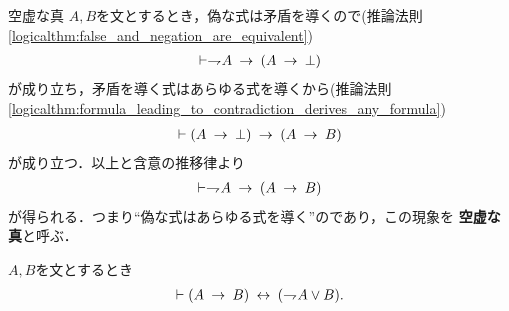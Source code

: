 	\begin{itembox}[l]{空虚な真}
		$A,B$を文とするとき，偽な式は矛盾を導くので(推論法則\ref{logicalthm:false_and_negation_are_equivalent})
		\begin{align}
			\vdash \negation A \rarrow (A \rarrow \bot)
		\end{align}
		が成り立ち，矛盾を導く式はあらゆる式を導くから(推論法則\ref{logicalthm:formula_leading_to_contradiction_derives_any_formula})
		\begin{align}
			\vdash (A \rarrow \bot) \rarrow (A \rarrow B)
		\end{align}
		が成り立つ．以上と含意の推移律より
		\begin{align}
			\vdash \negation A \rarrow (A \rarrow B)
		\end{align}
		が得られる．つまり``偽な式はあらゆる式を導く''のであり，この現象を
		{\bf 空虚な真}と呼ぶ．
	\end{itembox}
	
	\begin{screen}
		\begin{logicalthm}[含意は否定と論理和で表せる]\label{logicalthm:rule_of_inference_3}
			$A,B$を文とするとき
			\begin{align}
				\vdash (A \rarrow B) \lrarrow (\negation A \vee B).
			\end{align}
		\end{logicalthm}
	\end{screen}
	
